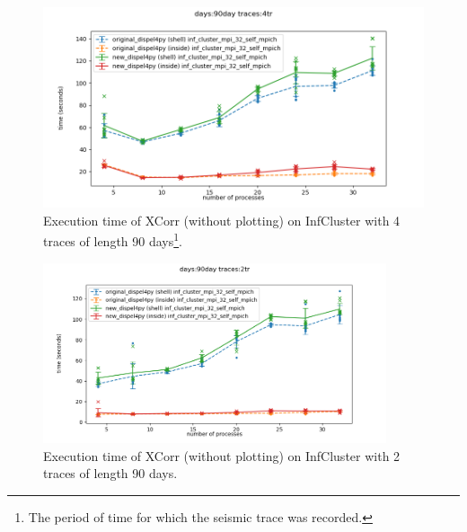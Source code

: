\begin{figure}[h]
\centering
\begin{minipage}{\textwidth}
    \includegraphics[width=1\textwidth]{figures/xcorr_infcluster_90day_4tr}
    \caption[Caption for LOF]%
      {Execution time of XCorr (without plotting) on InfCluster with 4 traces of length 90 days\footnote{The period of time for which the seismic trace was recorded.}.}
\label{fig:xcorr_infcluster}
\end{minipage}
\end{figure}

\begin{figure}[h]
\centering
    \includegraphics[width=0.9\textwidth]{figures/xcorr_infcluster_90day_2tr}
\caption{Execution time of XCorr (without plotting) on InfCluster with 2 traces of length 90 days.}
\label{fig:xcorr_infcluster_90_2}
\end{figure}

